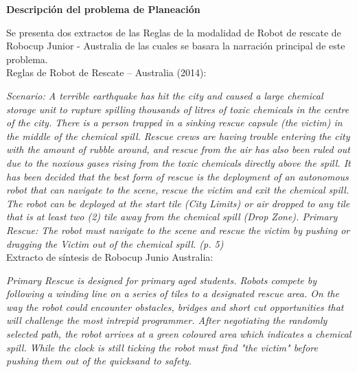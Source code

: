 \documentclass[letterpaper ,10pt]{article}
\begin{document}
\newpage

\centerline {\Huge\sffamily\textbf{ Descripción del problema de Planeación  }}
\vspace{0.5cm}
Se presenta dos extractos de las Reglas de la modalidad de Robot de rescate de Robocup Junior -  Australia de las cuales se basara la narración principal de este problema.\\
\medskip
Reglas de Robot de Rescate – Australia (2014):\\
{\textit {Scenario: A terrible earthquake has hit the city and caused a large chemical storage unit to rupture spilling thousands of litres of toxic chemicals in the centre of the city. There is a person trapped in a sinking rescue capsule (the victim) in the middle of the chemical spill. Rescue crews are having trouble entering the city with the amount of rubble around, and rescue from the air has also been ruled out due to the noxious gases rising from the toxic chemicals directly above the spill. It has been decided that the best form of rescue is the deployment of an autonomous robot that can navigate to the scene, rescue the victim and exit the chemical spill. The robot can be deployed at the start tile (City Limits) or air dropped to any tile that is at least two (2) tile away from the chemical spill (Drop Zone). Primary Rescue: The robot must navigate to the scene and rescue the victim by pushing or dragging the Victim out of the chemical spill. (p. 5) }\\

\medskip
Extracto de síntesis de Robocup Junio Australia:\\
{\textit {Primary Rescue is designed for primary aged students.
Robots compete by following a winding line on a series of tiles to a designated rescue area. On the way the robot could encounter obstacles, bridges and short cut opportunities that will challenge the most intrepid programmer. After negotiating the randomly selected path, the robot arrives at a green coloured area which indicates a chemical spill. While the clock is still ticking the robot must find "the victim" before pushing them out of the quicksand to safety.}

}}
\end{document}
